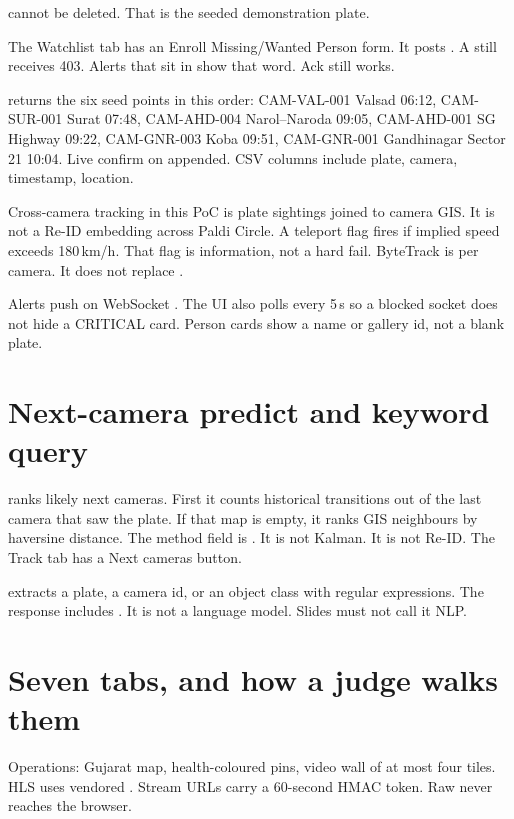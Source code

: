 \documentclass[listings]{csf301-notes}
\begin{document}
 cannot be deleted. That is the seeded demonstration plate.

The Watchlist tab has an Enroll Missing/Wanted Person form. It posts . A  still receives 403. Alerts that sit in  show that word. Ack still works.

\begin{example}
 returns the six seed points in this order: CAM-VAL-001 Valsad 06:12, CAM-SUR-001 Surat 07:48, CAM-AHD-004 Narol--Naroda 09:05, CAM-AHD-001 SG Highway 09:22, CAM-GNR-003 Koba 09:51, CAM-GNR-001 Gandhinagar Sector 21 10:04. Live confirm on  appended. CSV columns include plate, camera, timestamp, location.
\end{example}

Cross-camera tracking in this PoC is plate sightings joined to camera GIS. It is not a Re-ID embedding across Paldi Circle. A teleport flag fires if implied speed exceeds 180\,km/h. That flag is information, not a hard fail. ByteTrack  is per camera. It does not replace .

Alerts push on WebSocket . The UI also polls every 5\,s so a blocked socket does not hide a CRITICAL card. Person cards show a name or gallery id, not a blank plate.

\section{Next-camera predict and keyword query}
 ranks likely next cameras. First it counts historical transitions out of the last camera that saw the plate. If that map is empty, it ranks GIS neighbours by haversine distance. The method field is . It is not Kalman. It is not Re-ID. The Track tab has a Next cameras button.

 extracts a plate, a camera id, or an object class with regular expressions. The response includes . It is not a language model. Slides must not call it NLP.

\section{Seven tabs, and how a judge walks them}
Operations: Gujarat map, health-coloured pins, video wall of at most four tiles. HLS uses vendored . Stream URLs carry a 60-second HMAC token. Raw  never reaches the browser.
\end{document}
